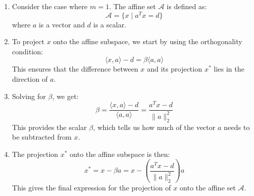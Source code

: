 \begin{example}
    \begin{enumerate}
        \item Consider the case where \( m = 1 \). The affine set \( \mathcal{A} \) is defined as:
        \[
        \mathcal{A} = \{ x \mid a^T x = d \}
        \]
        where \( a \) is a vector and \( d \) is a scalar.
    
        \item To project \( x \) onto the affine subspace, we start by using the orthogonality condition:
        \[
        \langle x, a \rangle - d = \beta \langle a, a \rangle
        \]
        This ensures that the difference between \( x \) and its projection \( x^* \) lies in the direction of \( a \).
    
        \item Solving for \( \beta \), we get:
        \[
        \beta = \frac{\langle x, a \rangle - d}{\langle a, a \rangle} = \frac{a^T x - d}{\| a \|_2^2}
        \]
        This provides the scalar \( \beta \), which tells us how much of the vector \( a \) needs to be subtracted from \( x \).
    
        \item The projection \( x^* \) onto the affine subspace is then:
        \[
        x^* = x - \beta a = x - \left( \frac{a^T x - d}{\| a \|_2^2} \right) a
        \]
        This gives the final expression for the projection of \( x \) onto the affine set \( \mathcal{A} \).
    \end{enumerate}            
\end{example}

